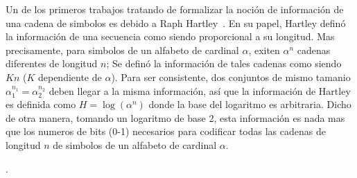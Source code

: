 
\label{s:SZ:Entropia}


\label{sec:SZ:DefinicionShannon}

Un de los primeros trabajos  tratando de formalizar la noci\'on de informaci\'on
de una cadena  de simbolos es debido a Raph  Hartley~\cite{Har28}.  En su papel,
Hartley defin\'o la informaci\'on de una secuencia como siendo proporcional a su
longitud. Mas precisamente,  para simbolos de un alfabeto  de cardinal $\alpha$,
exiten  $\alpha^n$   cadenas  diferentes  de   longitud  $n$;  Se   defin\'o  la
informaci\'on de tales cadenas como  siendo $K n$ ($K$ dependiente de $\alpha$).
Para  ser  consistente,  dos   conjuntos  de  mismo  tamanio  $\alpha_1^{n_1}  =
\alpha_2^{n_2}$   deben  llegar  a   la  misma   informaci\'on,  as\'i   que  la
informaci\'on de Hartley es definida como $H = \log\left( \alpha^n \right)$ donde
la base del logaritmo es arbitraria.  Dicho de otra manera, tomando un logaritmo
de  base 2,  esta  informaci\'on  es nada  mas  que los  numeros  de bits  (0-1)
necesarios para  codificar todas las cadenas  de longitud $n$ de  simbolos de un
alfabeto de cardinal $\alpha$.

.


